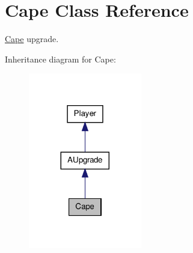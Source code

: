 \hypertarget{class_cape}{\section{Cape Class Reference}
\label{class_cape}
}


\hyperlink{class_cape}{Cape} upgrade.  




Inheritance diagram for Cape\-:\nopagebreak
\begin{figure}[H]
\begin{center}
\leavevmode
\includegraphics[width=140pt]{class_cape__inherit__graph}
\end{center}
\end{figure}
